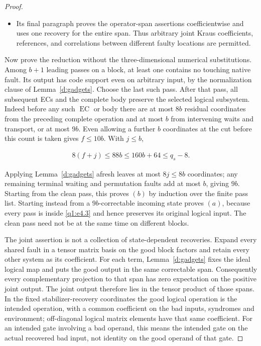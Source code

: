 \begin{proof}
\begin{itemize}
\item Its final paragraph proves the operator-span assertions coefficientwise and uses one recovery for the entire span. Thus arbitrary joint Kraus coefficients, references, and correlations between different faulty locations are permitted.
\end{itemize}

Now prove the reduction without the three-dimensional numerical substitutions. Among \(b+1\) leading passes on a block, at least one contains no touching native fault. Its output has code support even on arbitrary input, by the normalization clause of Lemma~\ref{d:gadgets}. Choose the last such pass. After that pass, all subsequent ECs and the complete body preserve the selected logical subsystem. Indeed before any such \(\operatorname{EC}\) or body there are at most \(8b\) residual coordinates from the preceding complete operation and at most \(b\) from intervening waits and transport, or at most \(9b\). Even allowing a further \(b\) coordinates at the cut before this count is taken gives \(f\le 10b\). With \(j\le b\),

\begin{equation}\label{q1:e4.3}
\begin{gathered}
8(f+j) \le  88b \le  160b+64 \le  q_{s}-8.
\end{gathered}
\end{equation}

Applying Lemma~\ref{d:gadgets} afresh leaves at most \(8j\le 8b\) coordinates; any remaining terminal waiting and permutation faults add at most \(b\), giving \(9b\). Starting from the clean pass, this proves \((b)\) by induction over the finite pass list. Starting instead from a \(9b\)-correctable incoming state proves \((a)\), because every pass is inside \eqref{q1:e4.3} and hence preserves its original logical input. The clean pass need not be at the same time on different blocks.

The joint assertion is not a collection of state-dependent recoveries. Expand every shared fault in a tensor matrix basis on the good block factors and retain every other system as its coefficient. For each term, Lemma~\ref{d:gadgets} fixes the ideal logical map and puts the good output in the same correctable span. Consequently every complementary projection to that span has zero expectation on the positive joint output. The joint output therefore lies in the tensor product of those spans. In the fixed stabilizer-recovery coordinates the good logical operation is the intended operation, with a common coefficient on the bad inputs, syndromes and environment; off-diagonal logical matrix elements have that same coefficient. For an intended gate involving a bad operand, this means the intended gate on the actual recovered bad input, not identity on the good operand of that gate.


\end{proof}
